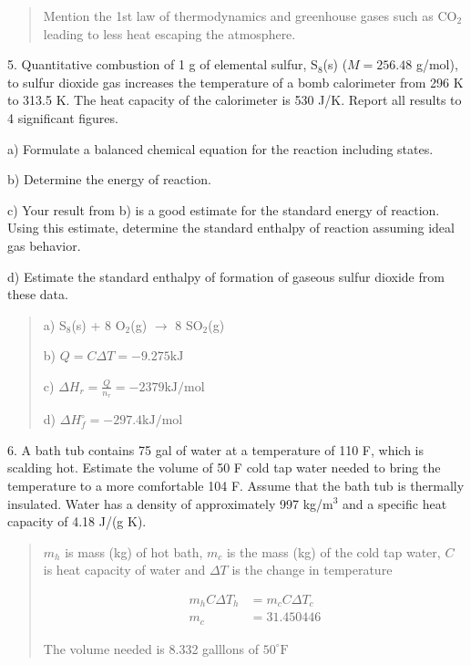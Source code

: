 \documentclass[11pt]{article}
\begin{document}
\begin{quote}
  {\color{blue} Mention the 1st law of thermodynamics and greenhouse gases such as
    CO$_2$ leading to less heat escaping the atmosphere.
  }
\end{quote}

5. Quantitative combustion of 1 g of elemental sulfur, S$_8$(s) ($M = 256.48$ g/mol),
to sulfur dioxide gas increases the temperature of a bomb calorimeter from 296 K to
313.5 K. The heat capacity of the calorimeter is 530 J/K. Report all results to 4
significant figures.

a) Formulate a balanced chemical equation for the reaction including states.

b) Determine the energy of reaction.

c) Your result from b) is a good estimate for the standard energy of reaction. Using this
estimate, determine the standard enthalpy of reaction assuming ideal gas behavior.

d) Estimate the standard enthalpy of formation of gaseous sulfur dioxide from these data.

\begin{quote}
  {\color{blue}
    a) S$_8$(s) + 8 O$_2$(g) $\rightarrow$ 8 SO$_2$(g)

    b) $Q = C\Delta T = -9.275\text{kJ}$

    c) $\Delta H_r = \frac{Q}{n_r} = -2379\text{kJ/mol}$

    d) $\Delta H^\circ_f = -297.4\text{kJ/mol}$
  }
\end{quote}

6. A bath tub contains 75 gal of water at a temperature of 110 F, which is scalding hot.
Estimate the volume of 50 F cold tap water needed to bring the temperature to a more
comfortable 104 F. Assume that the bath tub is thermally insulated. Water has a density
of approximately 997 kg/m$^3$ and a specific heat capacity of 4.18 J/(g K).

\begin{quote}
  {\color{blue} $m_h$ is mass (kg) of hot bath, $m_c$ is the mass (kg) of the cold tap
    water, $C$ is heat capacity of water and $\Delta T$ is the change in temperature

    \begin{align}
      m_h C \Delta T_h & = m_c C \Delta T_c \\
      m_c & = 31.450446
    \end{align}

    The volume needed is 8.332 galllons of $50^\circ\text{F}$
  }
\end{quote}

\pagebreak
\end{document}
